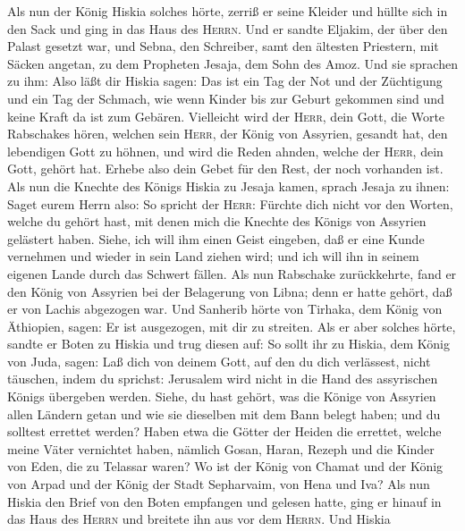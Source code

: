  Als nun der König Hiskia solches hörte, zerriß er seine
Kleider und hüllte sich in den Sack und ging in das Haus des
\textsc{Herrn}.  Und er sandte Eljakim, der über den
Palast gesetzt war, und Sebna, den Schreiber, samt den ältesten
Priestern, mit Säcken angetan, zu dem Propheten Jesaja, dem Sohn des
Amoz.  Und sie sprachen zu ihm: Also läßt dir Hiskia
sagen: Das ist ein Tag der Not und der Züchtigung und ein Tag der
Schmach, wie wenn Kinder bis zur Geburt gekommen sind und keine Kraft da
ist zum Gebären.  Vielleicht wird der \textsc{Herr}, dein
Gott, die Worte Rabschakes hören, welchen sein \textsc{Herr}, der König
von Assyrien, gesandt hat, den lebendigen Gott zu höhnen, und wird die
Reden ahnden, welche der \textsc{Herr}, dein Gott, gehört hat. Erhebe
also dein Gebet für den Rest, der noch vorhanden ist.  Als
nun die Knechte des Königs Hiskia zu Jesaja kamen,  sprach
Jesaja zu ihnen: Saget eurem Herrn also: So spricht der \textsc{Herr}:
Fürchte dich nicht vor den Worten, welche du gehört hast, mit denen mich
die Knechte des Königs von Assyrien gelästert haben. 
Siehe, ich will ihm einen Geist eingeben, daß er eine Kunde vernehmen
und wieder in sein Land ziehen wird; und ich will ihn in seinem eigenen
Lande durch das Schwert fällen.  Als nun Rabschake
zurückkehrte, fand er den König von Assyrien bei der Belagerung von
Libna; denn er hatte gehört, daß er von Lachis abgezogen war.
 Und Sanherib hörte von Tirhaka, dem König von Äthiopien,
sagen: Er ist ausgezogen, mit dir zu streiten. Als er aber solches
hörte, sandte er Boten zu Hiskia und trug diesen auf:  So
sollt ihr zu Hiskia, dem König von Juda, sagen: Laß dich von deinem
Gott, auf den du dich verlässest, nicht täuschen, indem du sprichst:
Jerusalem wird nicht in die Hand des assyrischen Königs übergeben
werden.  Siehe, du hast gehört, was die Könige von
Assyrien allen Ländern getan und wie sie dieselben mit dem Bann belegt
haben; und du solltest errettet werden?  Haben etwa die
Götter der Heiden die errettet, welche meine Väter vernichtet haben,
nämlich Gosan, Haran, Rezeph und die Kinder von Eden, die zu Telassar
waren?  Wo ist der König von Chamat und der König von
Arpad und der König der Stadt Sepharvaim, von Hena und Iva?
 Als nun Hiskia den Brief von den Boten empfangen und
gelesen hatte, ging er hinauf in das Haus des \textsc{Herrn} und
breitete ihn aus vor dem \textsc{Herrn}.  Und Hiskia
